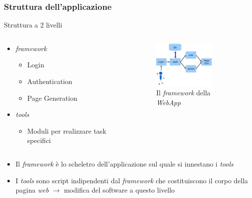 \begin{frame}
\frametitle{Struttura dell'applicazione}
\begin{block}{Struttura a 2 livelli}


\begin{columns}[t]

\begin{column}{5cm}
\begin{itemize}
\item \emph{framework}
\begin{itemize}
\item Login
\item Authentication
\item Page Generation
\end{itemize}
\item \emph{tools}
\begin{itemize}
\item Moduli per realizzare task specifici
\end{itemize}
\end{itemize}
\end{column}

\begin{column}{5cm}
\begin{figure}[htbp]
\includegraphics[width=3cm]{image/SchemaAppLogin-PageGen.pdf}
	\caption {Il \emph{framework} della \emph{WebApp}}
	\label{parte1webapp}
\end{figure}
\end{column}

\end{columns}
\end{block}

\begin{block}{}
\begin{itemize}
\item Il \emph{framework} è lo scheletro dell'applicazione sul quale si innestano i \emph{tools}
\item I \emph{tools} sono script indipendenti dal \emph{framework} che costituiscono il 
corpo della pagina \emph{web} $\rightarrow$ 
modifica del software a questo livello
\end{itemize}
\end{block}

\end{frame}

